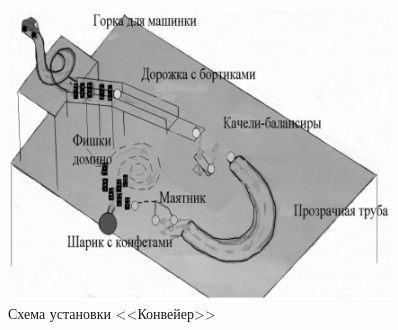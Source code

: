 \begin{figure}[h!]
  \begin{center}
    \includegraphics[width=0.9\textwidth]{authors/leybovich-fig3.png}
  \end{center}
  \caption{Схема установки <<Конвейер>>}
  \label{fig:leybovich-fig3}
\end{figure}
